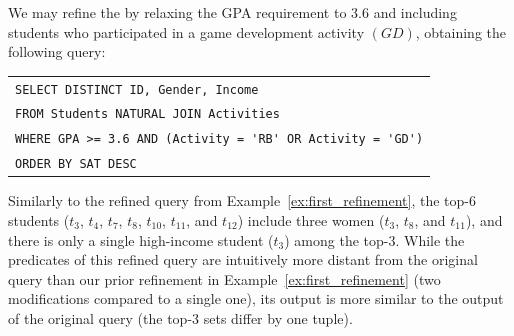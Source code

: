  \begin{example}
    \label{ex:refine-and-distance}
    We may refine the \running{} by relaxing the GPA requirement to $3.6$ and including students who participated in a game development activity $(GD)$,  obtaining the following query: 
    \begin{center}
    \footnotesize
    \begin{tabular}{l}
        \verb"SELECT DISTINCT ID, Gender, Income "\\
        \verb"FROM Students NATURAL JOIN Activities"\\
        \verb"WHERE GPA >= 3.6 AND (Activity = 'RB' OR Activity = 'GD')"\\
        \verb"ORDER BY SAT DESC"\\
    \end{tabular}
    \end{center}
    Similarly to the refined query from Example~\ref{ex:first_refinement}, the top-$6$ students %
    ($t_3$, $t_4$, $t_7$, $t_8$, $t_{10}$, $t_{11}$, and $t_{12}$) include three women ($t_3$, $t_8$, and $t_{11}$), and there is only a single high-income student ($t_3$) among the top-$3$. While the predicates of this refined query are intuitively more distant from the original query than our prior refinement in Example~\ref{ex:first_refinement} (two modifications compared to a single one), its output is more similar to the output of the original query (the top-$3$ sets differ by one tuple).
    

\end{example}
